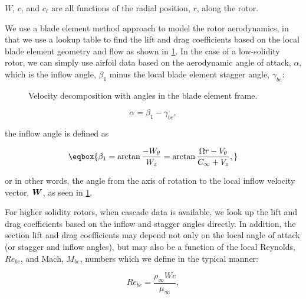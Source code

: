 %

\where \(W\), \(c\), and \(c_\ell\) %
are all functions of the radial position, \(r\), along the rotor.

We use a blade element method approach to model the rotor aerodynamics, in that we use a lookup table to find the lift and drag coefficients based on the local blade element geometry and flow as shown in \cref{fig:bladeelementangles}.
In the case of a low-solidity rotor, we can simply use airfoil data based on the aerodynamic angle of attack, \(\alpha\), which is the inflow angle, \(\beta_1\) minus the local blade element stagger angle, \(\gamma_{be}\):

\begin{figure}[h!]
    \centering
    \caption{Velocity decomposition with angles in the blade element frame.}
    \label{fig:bladeelementangles}
\end{figure}

\begin{equation}
    \label{eqn:localangleofattack}
    \alpha = \beta_1 - \gamma_{be},
\end{equation}

\where the inflow angle is defined as

\begin{equation}
    \label{eqn:inflowangle}
    \eqbox{
    \beta_1 = \arctan \frac{-W_\theta}{W_z} = \arctan \frac{\Omega r - V_\theta}{C_\infty + V_z},
}
\end{equation}

\noindent or in other words, the angle from the axis of rotation to the local inflow velocity vector, \(\bm{W}\), as seen in \cref{fig:bladeelementangles}.

For higher solidity rotors, when cascade data is available, we look up the lift and drag coefficients based on the inflow and stagger angles directly.
%
In addition, the section lift and drag coefficients may depend not only on the local angle of attack (or stagger and inflow angles), but may also be a function of the local Reynolds, \(Re_{be}\), and Mach, \(M_{be}\), numbers which we define in the typical manner:

\begin{equation}
    \label{eqn:re}
    Re_{be} = \frac{\rho_\infty W c}{\mu_\infty},
\end{equation}

